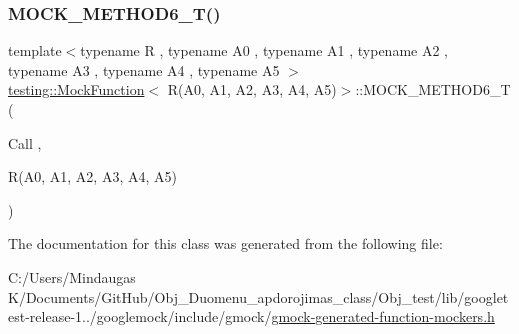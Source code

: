 \mbox{\label{classtesting_1_1_mock_function_3_01_r_07_a0_00_01_a1_00_01_a2_00_01_a3_00_01_a4_00_01_a5_08_4_ae66d20991ea3ab7d2b817c54df80653e}} 
\subsubsection{\texorpdfstring{MOCK\_METHOD6\_T()}{MOCK\_METHOD6\_T()}}
{\footnotesize\ttfamily template$<$typename R , typename A0 , typename A1 , typename A2 , typename A3 , typename A4 , typename A5 $>$ \\
\mbox{\hyperlink{classtesting_1_1_mock_function}{testing\+::\+Mock\+Function}}$<$ R(A0, A1, A2, A3, A4, A5)$>$\+::M\+O\+C\+K\+\_\+\+M\+E\+T\+H\+O\+D6\+\_\+T (\begin{DoxyParamCaption}\item[{Call}]{,  }\item[{R(A0, A1, A2, A3, A4, A5)}]{ }\end{DoxyParamCaption})}



The documentation for this class was generated from the following file\+:\begin{DoxyCompactItemize}
\item 
C\+:/\+Users/\+Mindaugas K/\+Documents/\+Git\+Hub/\+Obj\+\_\+\+Duomenu\+\_\+apdorojimas\+\_\+class/\+Obj\+\_\+test/lib/googletest-\/release-\/1../googlemock/include/gmock/\mbox{\hyperlink{_obj__test_2lib_2googletest-release-1_88_81_2googlemock_2include_2gmock_2gmock-generated-function-mockers_8h}{gmock-\/generated-\/function-\/mockers.\+h}}\end{DoxyCompactItemize}
